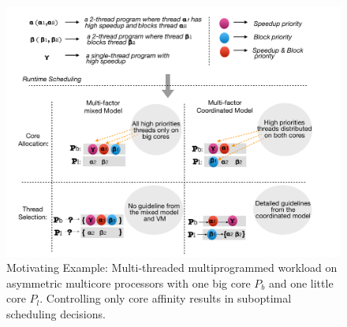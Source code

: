 \begin{figure}
\centering
\includegraphics[scale = 0.25]{figures/me.pdf}
\caption{Motivating Example: Multi-threaded multiprogrammed workload on asymmetric multicore processors with one big core $P_b$ and one little core $P_l$. Controlling only core affinity results in suboptimal scheduling decisions.}
\label{me}
\end{figure} 



